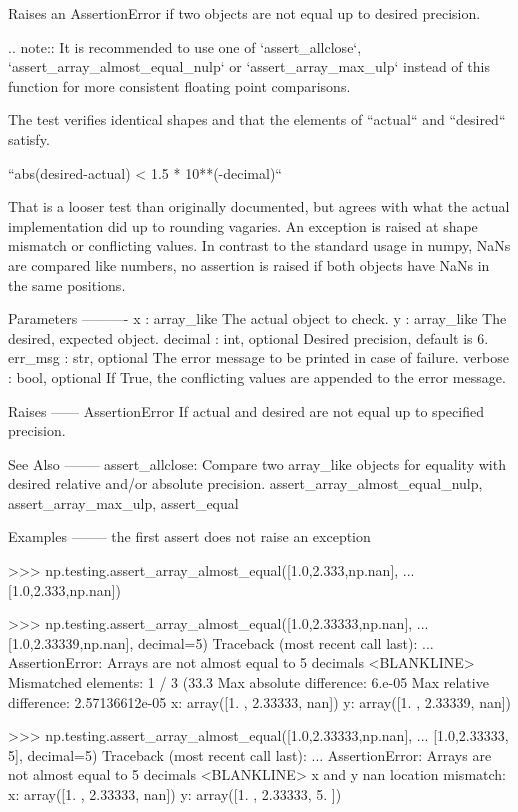 \begin{DoxyVerb}Raises an AssertionError if two objects are not equal up to desired
precision.

.. note:: It is recommended to use one of `assert_allclose`,
          `assert_array_almost_equal_nulp` or `assert_array_max_ulp`
          instead of this function for more consistent floating point
          comparisons.

The test verifies identical shapes and that the elements of ``actual`` and
``desired`` satisfy.

    ``abs(desired-actual) < 1.5 * 10**(-decimal)``

That is a looser test than originally documented, but agrees with what the
actual implementation did up to rounding vagaries. An exception is raised
at shape mismatch or conflicting values. In contrast to the standard usage
in numpy, NaNs are compared like numbers, no assertion is raised if both
objects have NaNs in the same positions.

Parameters
----------
x : array_like
    The actual object to check.
y : array_like
    The desired, expected object.
decimal : int, optional
    Desired precision, default is 6.
err_msg : str, optional
  The error message to be printed in case of failure.
verbose : bool, optional
    If True, the conflicting values are appended to the error message.

Raises
------
AssertionError
    If actual and desired are not equal up to specified precision.

See Also
--------
assert_allclose: Compare two array_like objects for equality with desired
                 relative and/or absolute precision.
assert_array_almost_equal_nulp, assert_array_max_ulp, assert_equal

Examples
--------
the first assert does not raise an exception

>>> np.testing.assert_array_almost_equal([1.0,2.333,np.nan],
...                                      [1.0,2.333,np.nan])

>>> np.testing.assert_array_almost_equal([1.0,2.33333,np.nan],
...                                      [1.0,2.33339,np.nan], decimal=5)
Traceback (most recent call last):
    ...
AssertionError:
Arrays are not almost equal to 5 decimals
<BLANKLINE>
Mismatched elements: 1 / 3 (33.3%
Max absolute difference: 6.e-05
Max relative difference: 2.57136612e-05
 x: array([1.     , 2.33333,     nan])
 y: array([1.     , 2.33339,     nan])

>>> np.testing.assert_array_almost_equal([1.0,2.33333,np.nan],
...                                      [1.0,2.33333, 5], decimal=5)
Traceback (most recent call last):
    ...
AssertionError:
Arrays are not almost equal to 5 decimals
<BLANKLINE>
x and y nan location mismatch:
 x: array([1.     , 2.33333,     nan])
 y: array([1.     , 2.33333, 5.     ])\end{DoxyVerb}
